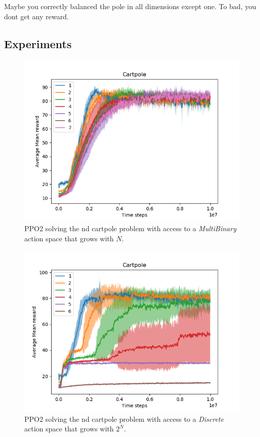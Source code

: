 Maybe you correctly balanced the pole in all dimensions except one. To bad, you dont get any reward.

\subsection{Experiments}


\begin{figure}
  \centering
  \includegraphics[width=1\textwidth,height=0.5\textheight]{../../pictures/figures/multibinary-nd-cart.png}
  \caption{PPO2 solving the nd cartpole problem with access to a \textit{MultiBinary} action space that grows with $N$.}
\end{figure}

\begin{figure}
\centering
\includegraphics[width=1\textwidth,height=0.5\textheight]{../../pictures/figures/discrete-nd-cart.png}
\caption{PPO2 solving the nd cartpole problem with access to a \textit{Discrete} action space that grows with $2^N$.}
\end{figure}


